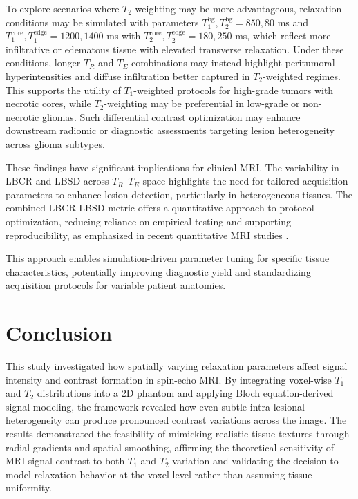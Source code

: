 \documentclass[10pt,a4paper,twoside]{article}
\begin{document}
To explore scenarios where $T_2$-weighting may be more advantageous, relaxation conditions may be simulated with parameters $T_1^{\text{bg}}, T_2^{\text{bg}} = 850, 80$ ms and $T_1^{\text{core}}, T_1^{\text{edge}} = 1200, 1400$ ms with $T_2^{\text{core}}, T_2^{\text{edge}} = 180, 250$ ms, which reflect more infiltrative or edematous tissue with elevated transverse relaxation. Under these conditions, longer $T_R$ and $T_E$ combinations may instead highlight peritumoral hyperintensities and diffuse infiltration better captured in $T_2$-weighted regimes. This supports the utility of $T_1$-weighted protocols for high-grade tumors with necrotic cores, while $T_2$-weighting may be preferential in low-grade or non-necrotic gliomas. Such differential contrast optimization may enhance downstream radiomic or diagnostic assessments targeting lesion heterogeneity across glioma subtypes.

These findings have significant implications for clinical MRI. The variability in LBCR and LBSD across $T_R$–$T_E$ space highlights the need for tailored acquisition parameters to enhance lesion detection, particularly in heterogeneous tissues. The combined LBCR-LBSD metric offers a quantitative approach to protocol optimization, reducing reliance on empirical testing and supporting reproducibility, as emphasized in recent quantitative MRI studies \cite{stikov2015, naganawa2002}.

This approach enables simulation-driven parameter tuning for specific tissue characteristics, potentially improving diagnostic yield and standardizing acquisition protocols for variable patient anatomies.


\section{Conclusion}

This study investigated how spatially varying relaxation parameters affect signal intensity and contrast formation in spin-echo MRI. By integrating voxel-wise $T_1$ and $T_2$ distributions into a 2D phantom and applying Bloch equation-derived signal modeling, the framework revealed how even subtle intra-lesional heterogeneity can produce pronounced contrast variations across the image. The results demonstrated the feasibility of mimicking realistic tissue textures through radial gradients and spatial smoothing, affirming the theoretical sensitivity of MRI signal contrast to both $T_1$ and $T_2$ variation and validating the decision to model relaxation behavior at the voxel level rather than assuming tissue uniformity.
\end{document}
